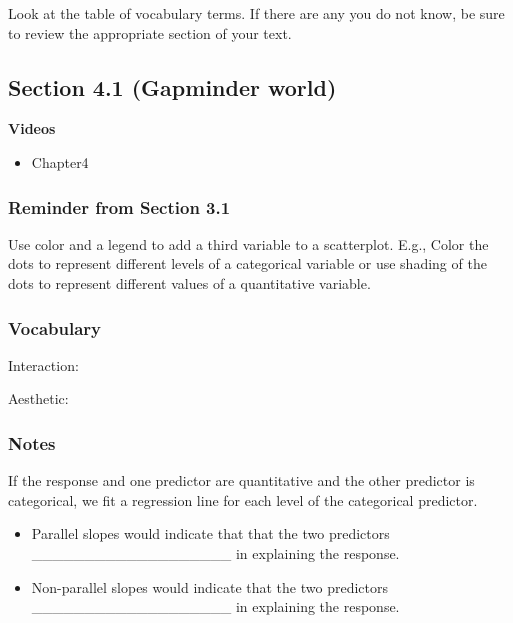 \documentclass[
]{report}
\providecommand{\tightlist}{%
  \setlength{\itemsep}{0pt}\setlength{\parskip}{0pt}}
\newcommand{\rgs}{\vspace{12pt}} %
\begin{document}
Look at the table of vocabulary terms. If there are any you do not know, be sure to review the appropriate section of your text.

\hypertarget{section-4.1-gapminder-world}{%
\subsection*{Section 4.1 (Gapminder world)}\label{section-4.1-gapminder-world}}


\textbf{Videos}

\begin{itemize}
\tightlist
\item
  Chapter4
\end{itemize}


\hypertarget{reminder-from-section-3.1}{%
\subsubsection*{Reminder from Section 3.1}\label{reminder-from-section-3.1}}

Use color and a legend to add a third variable to a scatterplot. E.g., Color the dots to represent different levels of a categorical variable or use shading of the dots to represent different values of a quantitative variable.

\hypertarget{vocabulary-8}{%
\subsubsection*{Vocabulary}\label{vocabulary-8}}

Interaction:
\rgs

Aesthetic:
\rgs

\hypertarget{notes-11}{%
\subsubsection*{Notes}\label{notes-11}}

If the response and one predictor are quantitative and the other predictor is categorical, we fit a regression line for each level of the categorical predictor.

\begin{itemize}
\item
  Parallel slopes would indicate that that the two predictors \_\_\_\_\_\_\_\_\_\_\_\_\_\_\_\_\_\_\_ in explaining the response.
\item
  Non-parallel slopes would indicate that the two predictors \_\_\_\_\_\_\_\_\_\_\_\_\_\_\_\_\_\_\_ in explaining the response.
\end{itemize}
\end{document}
